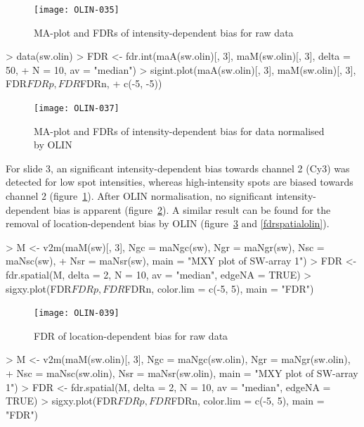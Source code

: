 \documentclass[a4paper,11pt]{article}
\begin{document}
\begin{figure}[t]
\centering
\texttt{[image: OLIN-035]}
\caption{MA-plot and FDRs of  intensity-dependent bias for raw data }
\label{fdrintraw}
\end{figure}



\begin{Schunk}
\begin{Sinput}
> data(sw.olin)
> FDR <- fdr.int(maA(sw.olin)[, 3], maM(sw.olin)[, 3], delta = 50, 
+     N = 10, av = "median")
> sigint.plot(maA(sw.olin)[, 3], maM(sw.olin)[, 3], FDR$FDRp, FDR$FDRn, 
+     c(-5, -5))
\end{Sinput}
\end{Schunk}



\begin{figure}
\centering
\texttt{[image: OLIN-037]}
\caption{MA-plot and FDRs of  intensity-dependent bias for data normalised by OLIN }
\label{fdrintolin}
\end{figure}

For slide 3, an significant intensity-dependent bias towards channel 2 (Cy3)
was detected for low spot intensities, whereas high-intensity spots are biased
towards channel 2 (figure~\ref{fdrintraw}). After OLIN normalisation, no significant intensity-dependent
bias is apparent (figure~\ref{fdrintolin}). A similar result can be found for the 
removal of location-dependent bias by OLIN (figure~\ref{fdrspatialraw} and \ref{fdrspatialolin}).


\begin{Schunk}
\begin{Sinput}
> M <- v2m(maM(sw)[, 3], Ngc = maNgc(sw), Ngr = maNgr(sw), Nsc = maNsc(sw), 
+     Nsr = maNsr(sw), main = "MXY plot of SW-array 1")
> FDR <- fdr.spatial(M, delta = 2, N = 10, av = "median", edgeNA = TRUE)
> sigxy.plot(FDR$FDRp, FDR$FDRn, color.lim = c(-5, 5), main = "FDR")
\end{Sinput}
\end{Schunk}




\begin{figure}
\centering
\texttt{[image: OLIN-039]}
\caption{FDR of location-dependent bias for raw data }
\label{fdrspatialraw}
\end{figure}


\begin{Schunk}
\begin{Sinput}
> M <- v2m(maM(sw.olin)[, 3], Ngc = maNgc(sw.olin), Ngr = maNgr(sw.olin), 
+     Nsc = maNsc(sw.olin), Nsr = maNsr(sw.olin), main = "MXY plot of SW-array 1")
> FDR <- fdr.spatial(M, delta = 2, N = 10, av = "median", edgeNA = TRUE)
> sigxy.plot(FDR$FDRp, FDR$FDRn, color.lim = c(-5, 5), main = "FDR")
\end{Sinput}
\end{Schunk}
\end{document}
